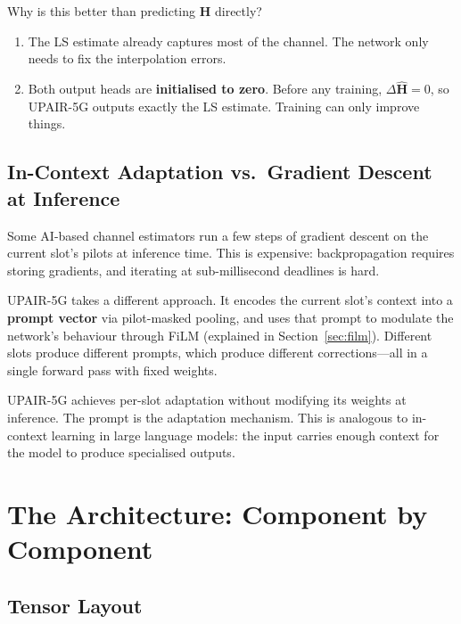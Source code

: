 \documentclass[11pt,a4paper]{article}
\newcommand{\bH}{\mathbf{H}}
\begin{document}
	Why is this better than predicting $\widehat{\bH}$ directly?
	\begin{enumerate}[nosep]
		\item The LS estimate already captures most of the channel.  The network only needs to fix the interpolation errors.
		\item Both output heads are \textbf{initialised to zero}.  Before any training, $\Delta\widehat{\bH} = 0$, so UPAIR-5G outputs exactly the LS estimate.  Training can only improve things.
	\end{enumerate}
	
	\subsection{In-Context Adaptation vs.\ Gradient Descent at Inference}
	
	Some AI-based channel estimators run a few steps of gradient descent on the current slot's pilots at inference time.  This is expensive: backpropagation requires storing gradients, and iterating at sub-millisecond deadlines is hard.
	
	UPAIR-5G takes a different approach.  It encodes the current slot's context into a \textbf{prompt vector} via pilot-masked pooling, and uses that prompt to modulate the network's behaviour through FiLM (explained in Section~\ref{sec:film}).  Different slots produce different prompts, which produce different corrections---all in a single forward pass with fixed weights.
	
	\begin{keyidea}
		UPAIR-5G achieves per-slot adaptation without modifying its weights at inference.  The prompt is the adaptation mechanism.  This is analogous to in-context learning in large language models: the input carries enough context for the model to produce specialised outputs.
	\end{keyidea}
	
	\section{The Architecture: Component by Component}
	\label{sec:architecture}
	
	\subsection{Tensor Layout}
	
\end{document}
